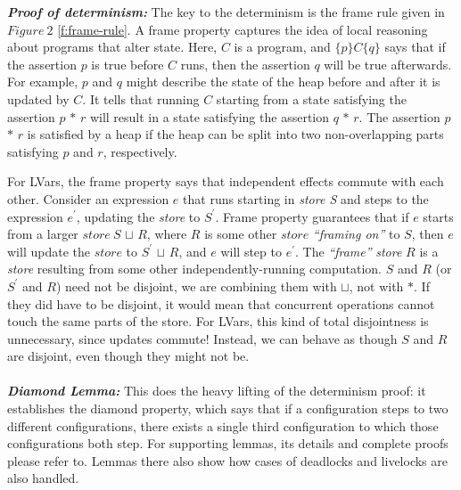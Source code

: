 \documentclass[twocolumn]{article}
\begin{document}
\textbf{\textit{Proof of determinism:}} The key to the determinism is the frame rule given in $Figure\ 2$ \ref{f:frame-rule}. A frame property captures the idea of local reasoning about programs that alter state\cite{lindsey}. Here, $C$ is a program, and $\{p\} C \{q\}$ says that if the assertion $p$ is true before $C$ runs, then the assertion $q$ will be true afterwards. For example, $p$ and $q$  might describe the state of the heap before and after it is updated by $C$. It tells that running $C$ starting from a state satisfying the assertion $p$ $\ast$ $r$ will result in a state satisfying the assertion $q$ $\ast$ $r$. The assertion $p$ $\ast$ $r$ is satisfied by a heap if the heap can be split into two non-overlapping parts satisfying $p$ and $r$, respectively.

For LVars, the frame property says that independent effects commute with each other. Consider an expression $e$ that runs starting in \emph{store S} and steps to the expression $e^{'}$, updating the \emph{store} to $S^{'}$. Frame property guarantees that if $e$ starts from a larger $store\ S$ $\sqcup$ $R$, where $R$ is some other $store$ \emph{“framing on”} to $S$, then $e$  will update the $store$ to $S^{′}$ $\sqcup$ $R$, and $e$ will step to $e^{′}$. The \emph{“frame”} \emph{store} $R$  is a \emph{store} resulting from some other independently-running computation. $S$ and $R$ (or $S^{′}$ and $R$) need not be disjoint, we are combining them with $\sqcup$, not with $\ast$. If they did have to be disjoint, it would mean that concurrent operations cannot touch the same parts of the store. For LVars, this kind of total disjointness is unnecessary, since updates commute! Instead, we can behave as though $S$ and $R$ are disjoint, even though they might not be. \\ \\
\textbf{\textit{Diamond Lemma:}} This does the heavy lifting of the determinism proof: it establishes the diamond property, which says that if a configuration steps to two different configurations, there exists a single third configuration to which those configurations both step. For supporting lemmas, its details and complete proofs please refer to\cite{lkuper}. Lemmas there also show how cases of deadlocks and livelocks are also handled.
\end{document}

